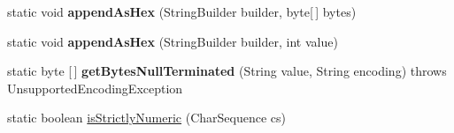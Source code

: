 \begin{DoxyCompactItemize}
\mbox{\label{classcom_1_1mysql_1_1jdbc_1_1_string_utils_a9998e2dccbad43b9e584b28daf1ab110}} 
static void {\bfseries append\+As\+Hex} (String\+Builder builder, byte\mbox{[}$\,$\mbox{]} bytes)
\item 
\mbox{\label{classcom_1_1mysql_1_1jdbc_1_1_string_utils_ae803414b52673af4d21d4a44e701bc72}} 
static void {\bfseries append\+As\+Hex} (String\+Builder builder, int value)
\item 
\mbox{\label{classcom_1_1mysql_1_1jdbc_1_1_string_utils_ab71a6c908170eaf08815b6210e5ad48a}} 
static byte \mbox{[}$\,$\mbox{]} {\bfseries get\+Bytes\+Null\+Terminated} (String value, String encoding)  throws Unsupported\+Encoding\+Exception 
\item 
static boolean \mbox{\hyperlink{classcom_1_1mysql_1_1jdbc_1_1_string_utils_ab43c5d12775b34b95c58cefcfc647755}{is\+Strictly\+Numeric}} (Char\+Sequence cs)
\end{DoxyCompactItemize}
